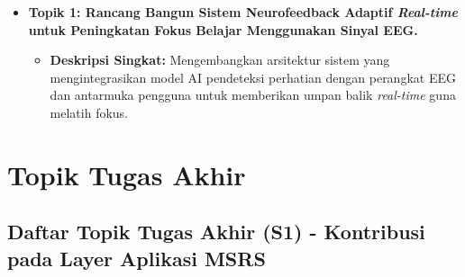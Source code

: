 \documentclass[
  letterpaper,
  DIV=11,
  numbers=noendperiod]{scrreprt}
\providecommand{\tightlist}{%
  \setlength{\itemsep}{0pt}\setlength{\parskip}{0pt}}
\begin{document}
\begin{itemize}
\tightlist
\item
  \textbf{Topik 1: Rancang Bangun Sistem Neurofeedback Adaptif
  \emph{Real-time} untuk Peningkatan Fokus Belajar Menggunakan Sinyal
  EEG.}

  \begin{itemize}
  \tightlist
  \item
    \textbf{Deskripsi Singkat:} Mengembangkan arsitektur sistem yang
    mengintegrasikan model AI pendeteksi perhatian dengan perangkat EEG
    dan antarmuka pengguna untuk memberikan umpan balik \emph{real-time}
    guna melatih fokus.
  \end{itemize}
\end{itemize}


\chapter{Topik Tugas Akhir}\label{topik-tugas-akhir}

\section{\texorpdfstring{\textbf{Daftar Topik Tugas Akhir (S1) -
Kontribusi pada Layer Aplikasi
MSRS}}{Daftar Topik Tugas Akhir (S1) - Kontribusi pada Layer Aplikasi MSRS}}\label{daftar-topik-tugas-akhir-s1---kontribusi-pada-layer-aplikasi-msrs}
\end{document}

